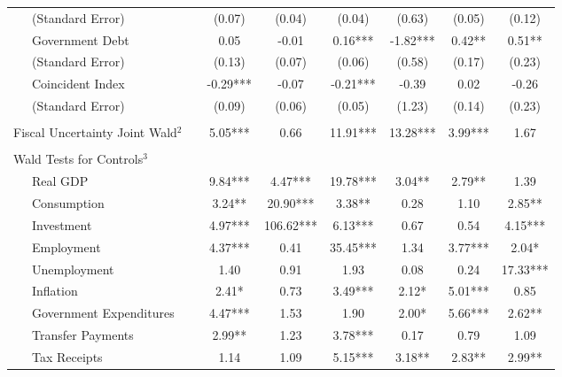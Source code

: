 \begin{table}
{\begin{center}
\begin{tabular}{l|S[table-format=3.2] S[table-format=3.2] S[table-format=3.2] S[table-format=3.2] S[table-format=3.2] S[table-format=3.2]}
~~~(Standard Error) & (0.07) & (0.04) & (0.04) & (0.63) & (0.05) & (0.12) \\ [0.2pc]
~~~Government Debt & 0.05 & -0.01 & 0.16*** & -1.82*** & 0.42** & 0.51** \\
~~~(Standard Error) & (0.13) & (0.07) & (0.06) & (0.58) & (0.17) & (0.23) \\ [0.2pc]
~~~Coincident Index & -0.29*** & -0.07 & -0.21*** & -0.39 & 0.02 & -0.26 \\
~~~(Standard Error) & (0.09) & (0.06) & (0.05) & (1.23) & (0.14) & (0.23) \\ [0.2pc]
\hline
 &  \\ [-0.25pc]
Fiscal Uncertainty Joint Wald$^2$~~ & 5.05*** & 0.66 & 11.91*** & 13.28*** & 3.99*** & 1.67 \\ [0.5pc] \hline
 &  \\ [-0.25pc]
Wald Tests for Controls$^3$ &  \\ [0.5pc]
~~~Real GDP & 9.84*** & 4.47*** & 19.78*** & 3.04** & 2.79** & 1.39 \\
~~~Consumption & 3.24** & 20.90*** & 3.38** & 0.28 & 1.10 & 2.85** \\
~~~Investment & 4.97*** & 106.62*** & 6.13*** & 0.67 & 0.54 & 4.15*** \\
~~~Employment & 4.37*** & 0.41 & 35.45*** & 1.34 & 3.77*** & 2.04* \\
~~~Unemployment & 1.40 & 0.91 & 1.93 & 0.08 & 0.24 & 17.33*** \\
~~~Inflation & 2.41* & 0.73 & 3.49*** & 2.12* & 5.01*** & 0.85 \\
~~~Government Expenditures & 4.47*** & 1.53 & 1.90 & 2.00* & 5.66*** & 2.62** \\
~~~Transfer Payments & 2.99** & 1.23 & 3.78*** & 0.17 & 0.79 & 1.09 \\
~~~Tax Receipts & 1.14 & 1.09 & 5.15*** & 3.18** & 2.83** & 2.99** \\



\end{tabular}
\end{center}}
\end{table}
